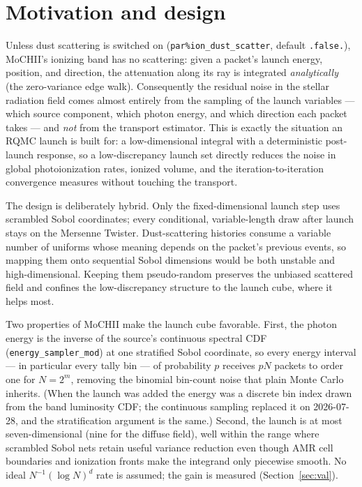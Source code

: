 \documentclass[english,a4paper]{my_memo}
\newcommand{\code}[1]{\texttt{#1}}
\begin{document}
\section{Motivation and design}
Unless dust scattering is switched on (\code{par\%ion\_dust\_scatter},
default \code{.false.}), MoCHII's ionizing band has no scattering: given a
packet's launch energy,
position, and direction, the attenuation along its ray is integrated
\emph{analytically} (the zero-variance edge walk).  Consequently the residual
noise in the stellar radiation field comes almost entirely from the sampling of
the launch variables --- which source component, which photon energy, and which
direction each packet takes --- and \emph{not} from the transport estimator.
This is exactly the situation an RQMC launch is built for: a low-dimensional
integral with a deterministic post-launch response, so a low-discrepancy launch
set directly reduces the noise in global photoionization rates, ionized volume,
and the iteration-to-iteration convergence measures without touching the
transport.

The design is deliberately hybrid.  Only the fixed-dimensional launch step uses
scrambled Sobol coordinates; every conditional, variable-length draw after
launch stays on the Mersenne Twister.  Dust-scattering histories consume a
variable number of uniforms whose meaning depends on the packet's previous
events, so mapping them onto sequential Sobol dimensions would be both unstable
and high-dimensional.  Keeping them pseudo-random preserves the unbiased
scattered field and confines the low-discrepancy structure to the launch cube,
where it helps most.

Two properties of MoCHII make the launch cube favorable.  First, the photon
energy is the inverse of the source's continuous spectral CDF
(\code{energy\_sampler\_mod}) at one stratified Sobol coordinate, so every
energy interval --- in particular every tally bin --- of probability $p$
receives $pN$ packets to order one for $N = 2^m$, removing the binomial
bin-count noise that plain Monte Carlo inherits.  (When the launch was added
the energy was a discrete bin index drawn from the band luminosity CDF; the
continuous sampling replaced it on 2026-07-28, and the stratification argument
is the same.)  Second, the launch is at most seven-dimensional (nine for the diffuse
field), well within the range where scrambled Sobol nets retain useful variance
reduction even though AMR cell boundaries and ionization fronts make the
integrand only piecewise smooth.  No ideal $N^{-1}(\log N)^d$ rate is assumed;
the gain is measured (Section~\ref{sec:val}).
\end{document}
